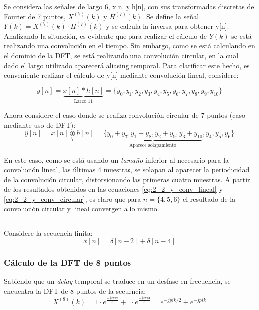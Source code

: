 	Se considera las señales de largo 6, x[n] y h[n], con sus transformadas discretas de Fourier de 7 puntos, $X^{(7)}(k)$ y $H^{(7)}(k)$. Se define la señal $Y(k) = X^{(7)}(k) \cdot H^{(7)}(k)$ y se calcula la inversa para obtener y[n]. Analizando la situación, es evidente que para realizar el cálculo de $Y(k)$ se está realizando una convolución en el tiempo. Sin embargo, como se está calculando en el dominio de la DFT, se está realizando una convolución circular, en la cual dado el largo utilizado aparecerá aliasing temporal. Para clarificar este hecho, es conveniente realizar el cálculo de y[n] mediante convolución lineal, considere:
	
	\begin{equation}
		y[n] = \underbrace{x[n] * h[n]}_{\text{Largo 11}} = \{ y_{0}, y_{1}, y_{2}, y_{3}, y_{4}, y_{5}, y_{6}, y_{7}, y_{8}, y_{9},y_{10} \} 
		\label{eq:2_2_y_conv_lineal}
	\end{equation}
	
	Ahora considere el caso donde se realiza convolución circular de 7 puntos (caso mediante uso de DFT):
	\begin{equation}
		\hat{y}[n] = x[n] \underset{7}{\circledast} h[n] = \underbrace{\{ y_{0}+y_{7}, y_{1}+y_{8}, y_{2}+y_{9}, y_{3}+y_{10}}_{\text{Aparece solapamiento}}, y_{4}, y_{5}, y_{6}\}
		\label{eq:2_2_y_conv_circular}
	\end{equation}
	
	En este caso, como se está usando un \textit{tamaño} inferior al necesario para la convolución lineal, las últimas 4 muestras, se solapan al aparecer la periodicidad de la convolución circular, distorsionando las primeras cuatro muestras. A partir de los resultados obtenidos en las ecuaciones \ref{eq:2_2_y_conv_lineal} y \ref{eq:2_2_y_conv_circular}, es claro que para $ n = \{ 4, 5, 6 \}$ el resultado de la convolución circular y lineal convergen a lo mismo. 
	
	\subsection{} %
		Considere la secuencia finita: 
			\begin{equation}
				x[n] = \delta[n-2] + \delta[n-4]
				\label{2_3_finite_seq}
			\end{equation}
			
			\subsubsection{Cálculo de la DFT de 8 puntos}
				Sabiendo que un \textit{delay} temporal se traduce en un desfase en frecuencia, se encuentra la DFT de 8 puntos de la secuencia:
				\begin{equation}
					X^{(8)}(k) = 1 \cdot e^{\frac{-j2\pi k 2}{8}} + 1 \cdot e^{\frac{-j2\pi k 4}{8}} = e^{-jpi k /2} + e^{-jpi k}
					\label{eq:2_3_1_dft}
				\end{equation}
				

